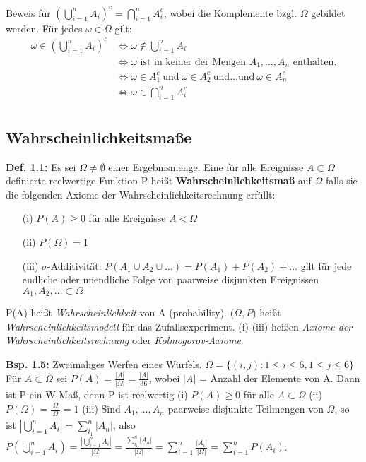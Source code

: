 \documentclass[a4paper,11pt]{article}
\begin{document}
\vspace{6pt}
\noindent Beweis für $(\bigcup_{i=1}^{n}A_i)^c = \bigcap_{i=1}^{n}A_i^c$, wobei die Komplemente bzgl. $\Omega$ gebildet werden.
\newline Für jedes $\omega\in\Omega$ gilt:
\begin{align*}
\omega\in(\bigcup_{i=1}^{n}A_i)^c &\Leftrightarrow \omega\notin\bigcup_{i=1}^{n}A_i\\
&\Leftrightarrow \omega\text{ ist in keiner der Mengen } A_1,\dots,A_n\text{ enthalten.}\\ 
&\Leftrightarrow \omega\in A_1^c\ \text{und}\ \omega\in A_2^c\ \text{und}\dots\text{und}\ \omega\in A_n^c\\
&\Leftrightarrow \omega\in\bigcap_{i=1}^{n}A_i^c\\
\end{align*}

\subsection{Wahrscheinlichkeitsmaße}

\noindent\textbf{Def. 1.1:} Es sei $\Omega\neq\emptyset$ einer Ergebnismenge. 
Eine für alle Ereignisse $A\subset\Omega$ definierte reelwertige Funktion P heißt \textbf{Wahrscheinlichkeitsmaß} auf $\Omega$ falls sie die folgenden Axiome der Wahrscheinlichkeitsrechnung erfüllt:
\begin{itemize}
    \item[(i)] $P(A)\geq0$ für alle Ereignisse $A<\Omega$
    \item[(ii)] $P(\Omega)=1$
    \item[(iii)] $\sigma$-Additivität: $P(A_1 \cup A_2\cup\dots) = P(A_1)+P(A_2)+\dots$ gilt für jede endliche oder unendliche Folge von paarweise disjunkten Ereignissen $A_1,A_2,\dots\subset\Omega$    
\end{itemize}

\noindent P(A) heißt \textit{Wahrscheinlichkeit} von A (probability). 
($\Omega,P$) heißt \textit{Wahrscheinlichkeitsmodell} für das Zufallsexperiment. 
(i)-(iii) heißen \textit{Axiome der Wahrscheinlichkeitsrechnung} oder \textit{Kolmogorov-Axiome}.

\vspace{6pt}
\noindent\textbf{Bsp. 1.5:} Zweimaliges Werfen eines Würfels.
\newline $\Omega = \{(i,j):1\leq i\leq6,1\leq j\leq6\}$
\newline Für $A\subset\Omega$ sei $P(A)=\frac{|A|}{|\Omega|}=\frac{|A|}{36}$, wobei $|A|$ = Anzahl der Elemente von A. Dann ist P ein W-Maß, denn P ist reelwertig
\newline (i) $P(A) \geq0$ für alle $A\subset\Omega$
\newline (ii) $P(\Omega)=\frac{|\Omega|}{|\Omega|}=1$
\newline (iii) Sind $A_1,\dots,A_n$ paarweise disjunkte Teilmengen von $\Omega$, so ist $|\bigcup_{i=1}^{n}A_i| = \sum_{i_1}^{n}|A_n|$, 
also $P(\bigcup_{i=1}^{n}A_i) = \frac{|\bigcup_{i=1}^{n}A_i|}{|\Omega|} = \frac{\sum_{i_1}^{n}|A_n|}{|\Omega|} = \sum_{i=1}^{n}\frac{|A_i|}{|\Omega|} = \sum_{i=1}^{n}P(A_i)$.
\end{document}

